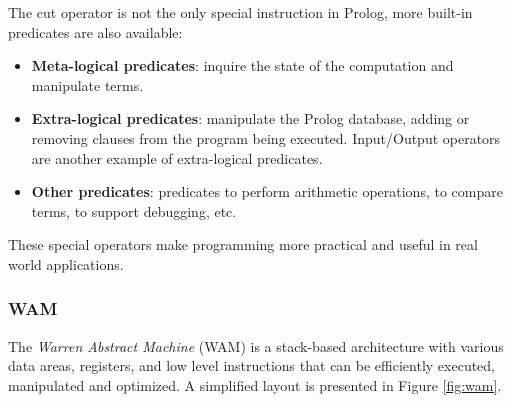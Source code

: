 The cut operator is not the only special instruction in Prolog, more built-in predicates are also available:

\begin{itemize}
  \item \textbf{Meta-logical predicates}: inquire the state of the computation and manipulate terms.
  \item \textbf{Extra-logical predicates}: manipulate the Prolog database, adding or removing clauses from
  the program being executed. Input/Output operators are another example of extra-logical predicates.
  \item \textbf{Other predicates}: predicates to perform arithmetic operations, to compare terms, to support debugging, etc.
\end{itemize}

These special operators make programming more practical and useful in real world applications.

\subsubsection{WAM}

The \textit{Warren Abstract Machine} (WAM) is a stack-based architecture
with various data areas, registers, and low level instructions that can be efficiently executed, manipulated and optimized.
A simplified layout is presented in Figure \ref{fig:wam}.

